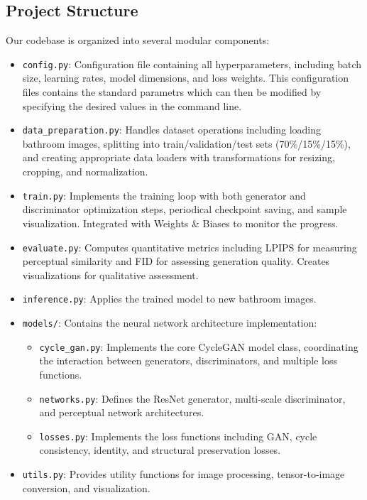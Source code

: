 \documentclass[twocolumn,superscriptaddress,aps]{revtex4-1}
\begin{document}
\subsection{Project Structure}

Our codebase is organized into several modular components:

\begin{itemize}
    \item \texttt{config.py}: Configuration file containing all hyperparameters, including batch size, learning rates, model dimensions, and loss weights. This configuration files contains the standard parametrs which can then be modified by specifying the desired values in the command line.
    
    \item \texttt{data\_preparation.py}: Handles dataset operations including loading bathroom images, splitting into train/validation/test sets (70\%/15\%/15\%), and creating appropriate data loaders with transformations for resizing, cropping, and normalization.
    
    \item \texttt{train.py}: Implements the training loop with both generator and discriminator optimization steps, periodical checkpoint saving, and sample visualization. Integrated with Weights \& Biases to monitor the progress.
    
    \item \texttt{evaluate.py}: Computes quantitative metrics including LPIPS for measuring perceptual similarity and FID for assessing generation quality. Creates visualizations for qualitative assessment.
    
    \item \texttt{inference.py}: Applies the trained model to new bathroom images.
    
    \item \texttt{models/}: Contains the neural network architecture implementation:
    \begin{itemize}
        \item \texttt{cycle\_gan.py}: Implements the core CycleGAN model class, coordinating the interaction between generators, discriminators, and multiple loss functions.
        \item \texttt{networks.py}: Defines the ResNet generator, multi-scale discriminator, and perceptual network architectures.
        \item \texttt{losses.py}: Implements the loss functions including GAN, cycle consistency, identity, and structural preservation losses.
    \end{itemize}
    
    \item \texttt{utils.py}: Provides utility functions for image processing, tensor-to-image conversion, and visualization.
\end{itemize}
\end{document}
